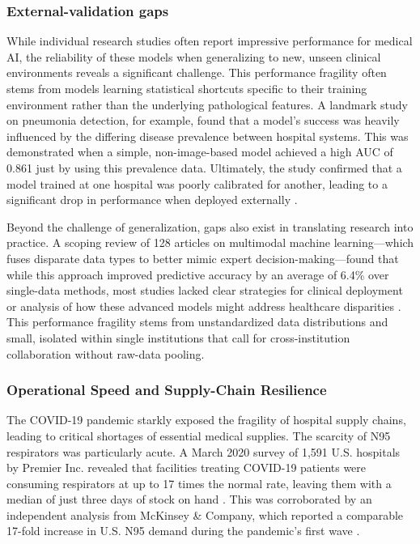 \documentclass[12pt]{report}
\begin{document}
\subsubsection{External-validation gaps}
While individual research studies often report impressive performance for medical AI, the reliability of these models when generalizing to new, unseen clinical environments reveals a significant challenge. This performance fragility often stems from models learning statistical shortcuts specific to their training environment rather than the underlying pathological features. A landmark study on pneumonia detection, for example, found that a model's success was heavily influenced by the differing disease prevalence between hospital systems. This was demonstrated when a simple, non-image-based model achieved a high AUC of 0.861 just by using this prevalence data. Ultimately, the study confirmed that a model trained at one hospital was poorly calibrated for another, leading to a significant drop in performance when deployed externally \cite{zech2018variable}.

Beyond the challenge of generalization, gaps also exist in translating research into practice. A scoping review of 128 articles on multimodal machine learning—which fuses disparate data types to better mimic expert decision-making—found that while this approach improved predictive accuracy by an average of 6.4\% over single-data methods, most studies lacked clear strategies for clinical deployment or analysis of how these advanced models might address healthcare disparities \cite{kline2022multimodal}. This performance fragility stems from unstandardized data distributions and small, isolated within single institutions that call for cross-institution collaboration without raw-data pooling.

\subsubsection{Operational Speed and Supply-Chain Resilience}
The COVID-19 pandemic starkly exposed the fragility of hospital supply chains, leading to critical shortages of essential medical supplies. The scarcity of N95 respirators was particularly acute. A March 2020 survey of 1,591 U.S. hospitals by Premier Inc. revealed that facilities treating COVID-19 patients were consuming respirators at up to 17 times the normal rate, leaving them with a median of just three days of stock on hand \cite{Premier2020N95}. This was corroborated by an independent analysis from McKinsey \& Company, which reported a comparable 17-fold increase in U.S. N95 demand during the pandemic's first wave \cite{McKinsey2020Medtech}.
\end{document}
